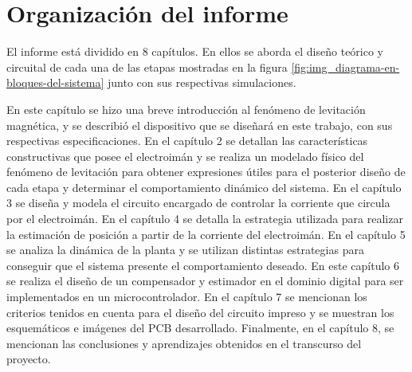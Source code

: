 \section{Organización del informe}

El informe está dividido en 8 capítulos. En ellos se aborda el diseño teórico y circuital de cada una de las etapas mostradas en la figura \ref{fig:img_diagrama-en-bloques-del-sistema} junto con sus respectivas simulaciones.

En este capítulo se hizo una breve introducción al fenómeno de levitación magnética, y se describió el dispositivo que se diseñará en este trabajo, con sus respectivas especificaciones. En el capítulo 2 se detallan las características constructivas que posee el electroimán y se realiza un modelado físico del fenómeno de levitación para obtener expresiones útiles para el posterior diseño de cada etapa y determinar el comportamiento dinámico del sistema. En el capítulo 3 se diseña y modela el circuito encargado de controlar la corriente que circula por el electroimán. En el capítulo 4 se detalla la estrategia utilizada para realizar la estimación de posición a partir de la corriente del electroimán. En el capítulo 5 se analiza la dinámica de la planta y se utilizan distintas estrategias para conseguir que el sistema presente el comportamiento deseado. En este capítulo 6 se realiza el diseño de un compensador y estimador en el dominio digital para ser implementados en un microcontrolador. En el capítulo 7 se mencionan los criterios tenidos en cuenta para el diseño del circuito impreso y se muestran los esquemáticos e imágenes del PCB desarrollado. Finalmente, en el capítulo 8, se mencionan las conclusiones y aprendizajes obtenidos en el transcurso del proyecto.

 